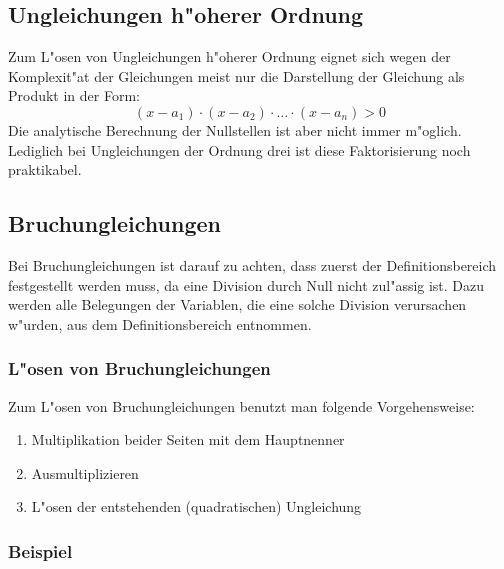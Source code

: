 \subsection{Ungleichungen h"oherer Ordnung}

Zum L"osen von Ungleichungen h"oherer Ordnung eignet sich wegen der Komplexit"at der Gleichungen meist nur die Darstellung der Gleichung als Produkt in der Form: 
\[(x - a_1) \cdot (x - a_2) \cdot \ldots \cdot (x - a_n) > 0 \]
Die analytische Berechnung der Nullstellen ist aber nicht immer m"oglich. Lediglich bei Ungleichungen der Ordnung drei ist diese Faktorisierung noch praktikabel.

\subsection{Bruchungleichungen}

Bei Bruchungleichungen ist darauf zu achten, dass zuerst der Definitionsbereich festgestellt werden muss, da eine Division durch Null nicht zul"assig ist. Dazu werden alle Belegungen der Variablen, die eine solche Division verursachen w"urden, aus dem Definitionsbereich entnommen.

\subsubsection{L"osen von Bruchungleichungen}

Zum L"osen von Bruchungleichungen benutzt man folgende Vorgehensweise:
\begin{enumerate}
\item Multiplikation beider Seiten mit dem Hauptnenner
\item Ausmultiplizieren
\item L"osen der entstehenden (quadratischen) Ungleichung
\end{enumerate}

\subsubsection{Beispiel}

